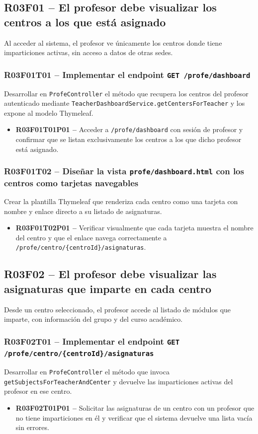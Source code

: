 \documentclass[12pt, a4paper]{report}
\begin{document}
\subsection{R03F01 -- El profesor debe visualizar los centros a los que está asignado}

Al acceder al sistema, el profesor ve únicamente los centros donde tiene imparticiones activas, sin acceso a datos de otras sedes.

\subsubsection{R03F01T01 -- Implementar el endpoint \texttt{GET /profe/dashboard}}
Desarrollar en \texttt{ProfeController} el método que recupera los centros del profesor autenticado mediante \texttt{TeacherDashboardService.getCentersForTeacher} y los expone al modelo Thymeleaf.
\begin{itemize}
  \item \textbf{R03F01T01P01 --} Acceder a \texttt{/profe/dashboard} con sesión de profesor y confirmar que se listan exclusivamente los centros a los que dicho profesor está asignado.
\end{itemize}

\subsubsection{R03F01T02 -- Diseñar la vista \texttt{profe/dashboard.html} con los centros como tarjetas navegables}
Crear la plantilla Thymeleaf que renderiza cada centro como una tarjeta con nombre y enlace directo a su listado de asignaturas.
\begin{itemize}
  \item \textbf{R03F01T02P01 --} Verificar visualmente que cada tarjeta muestra el nombre del centro y que el enlace navega correctamente a \texttt{/profe/centro/\{centroId\}/asignaturas}.
\end{itemize}

\subsection{R03F02 -- El profesor debe visualizar las asignaturas que imparte en cada centro}

Desde un centro seleccionado, el profesor accede al listado de módulos que imparte, con información del grupo y del curso académico.

\subsubsection{R03F02T01 -- Implementar el endpoint \texttt{GET /profe/centro/\{centroId\}/asignaturas}}
Desarrollar en \texttt{ProfeController} el método que invoca \texttt{getSubjectsForTeacherAndCenter} y devuelve las imparticiones activas del profesor en ese centro.
\begin{itemize}
  \item \textbf{R03F02T01P01 --} Solicitar las asignaturas de un centro con un profesor que no tiene imparticiones en él y verificar que el sistema devuelve una lista vacía sin errores.
\end{itemize}
\end{document}
